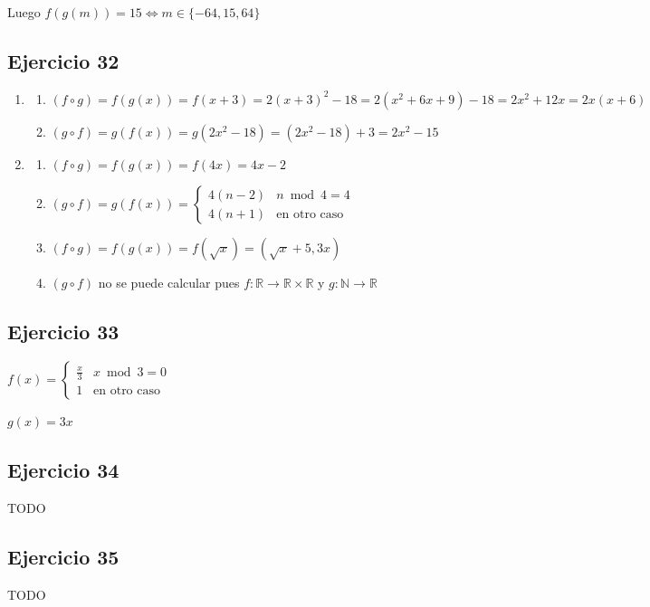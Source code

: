 Luego $f(g(m)) = 15 \iff m \in \{ -64, 15, 64 \}$

\subsection{Ejercicio 32}

\begin{enumerate}
    \item \begin{enumerate}
        \item $(f \circ g) = f(g(x)) = f(x+3) = 2(x+3)^2 -18 = 2(x^2 +6x +9) -18 = 2x^2 +12x = 2x(x+6)$
        \item $(g \circ f) = g(f(x)) = g(2x^2 - 18) = (2x^2 - 18) +3 = 2x^2 -15$
    \end{enumerate}
    \item \begin{enumerate}
        \item $(f \circ g) = f(g(x)) = f(4x) = 4x-2$
        \item $(g \circ f) = g(f(x)) = \begin{cases}
            4(n-2) & n \bmod 4 = 4 \\
            4(n+1) & \text{en otro caso}
        \end{cases}$
    \item $(f \circ g) = f(g(x)) = f(\sqrt{x}) = (\sqrt{x} +5, 3x)$
    \item $(g \circ f) $ no se puede calcular pues $f: \mathbb{R} \rightarrow \mathbb{R} \times \mathbb{R}$ y $g: \mathbb{N} \rightarrow \mathbb{R}$
    \end{enumerate}
\end{enumerate}

\subsection{Ejercicio 33}

$f(x) = \begin{cases}
    \frac{x}{3} & x \bmod 3 = 0 \\
    1 & \text{en otro caso}
\end{cases}$

$g(x) = 3x$

\subsection{Ejercicio 34}
TODO

\subsection{Ejercicio 35}
TODO


